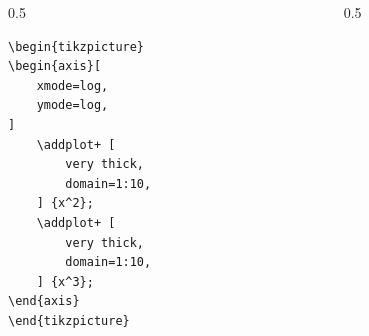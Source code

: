 \documentclass[12pt,aspectratio=169,ignorenonframetext]{ltxbeamer}
\begin{document}
\begin{frame}[fragile]
\bigskip

\begin{columns}
    \begin{column}{0.5\textwidth}
        \begin{verbatim}
\begin{tikzpicture}
\begin{axis}[
    xmode=log,
    ymode=log,
]
    \addplot+ [
        very thick,
        domain=1:10,
    ] {x^2};
    \addplot+ [
        very thick,
        domain=1:10,
    ] {x^3};
\end{axis}
\end{tikzpicture}
        \end{verbatim}
    \end{column}
    {\color{gray} \vline}
    \begin{column}{0.5\textwidth}
        \lmr
    \end{column}
\end{columns}
\end{frame}
\end{document}
